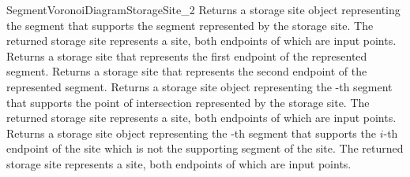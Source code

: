 \begin{ccRefConcept}{SegmentVoronoiDiagramStorageSite_2}
\ccAccessFunctions
%
\ccGlue
{}
         {Returns a storage site object representing the segment
           that supports the segment represented by the storage site.
           The returned storage site represents a site, both endpoints
           of which are input points.
  }
%
\ccGlue
{}
{Returns a storage site that represents the first endpoint of the
  represented segment.
  }
%
\ccGlue
{}
{Returns a storage site that represents the second endpoint of the
  represented segment.
  }
%
\ccGlue
{}
         {Returns a storage site object representing the -th
           segment that supports the point of intersection represented
           by the storage site.
           The returned storage site represents a site, both endpoints
           of which are input points.
  }
%
\ccGlue
{}
         {Returns a storage site object representing the -th
           segment that supports the $i$-th endpoint of the site
           which is not the supporting segment of the site.
           The returned storage site represents a site, both endpoints
           of which are input points.
           }
%
\ccGlue
{}
%
\ccGlue
{}
\end{ccRefConcept}
